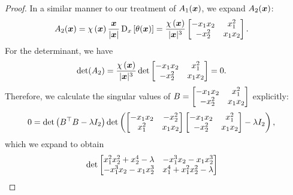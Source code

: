 \begin{proof}
    In a similar manner to our treatment of $A_1({{\bm{x}}})$, we expand $ A_2({{\bm{x}}})$:
    \begin{align*}
        A_2({{\bm{x}}}) &= \chi\left({{\bm{x}}}\right)\frac{{{\bm{x}}}}{|{{\bm{x}}}|}\mathop{}\!\mathrm{D}_x\left[\theta({{\bm{x}}}) \right]
        =  \frac{\chi\left({{\bm{x}}}\right)}{|{{\bm{x}}}|^3} \begin{bmatrix} -{x}_1{x}_2 & {x}_1^2 \\ -{x}_2^2 &{x}_1{x}_2  \end{bmatrix}.
    \end{align*}
    For the determinant, we have
    \begin{align*}
        \det(A_2) &=   \frac{\chi\left({{\bm{x}}}\right)}{|{{\bm{x}}}|^3}  \det \begin{bmatrix} -{x}_1{x}_2 & {x}_1^2 \\ -{x}_2^2 &{x}_1{x}_2  \end{bmatrix}
        =0.
    \end{align*}
    Therefore, we calculate the singular values of $B=\begin{bmatrix} -{x}_1{x}_2 & {x}_1^2 \\ -{x}_2^2 &{x}_1{x}_2  \end{bmatrix}$ explicitly:
    \begin{align*}
        0 &= \det\left( B^\top B -\lambda I_2\right)
        \det\left(\begin{bmatrix} -{x}_1{x}_2 & -{x}_2^2 \\ {x}_1^2 &{x}_1{x}_2  \end{bmatrix}\begin{bmatrix} -{x}_1{x}_2 & {x}_1^2 \\ -{x}_2^2 &{x}_1{x}_2  \end{bmatrix} -\lambda I_2 \right),
    \end{align*}
    which we expand to obtain
    \begin{align*}
        &\det \begin{bmatrix} \xx^2\xy^2 + \xy^4 - \lambda& -\xx^3\xy - \xx\xy^3 \\ -\xx^3\xy - \xx\xy^3 & \xx^4 + \xx^2\xy^2 -\lambda \end{bmatrix}

\end{align*}
\end{proof}
